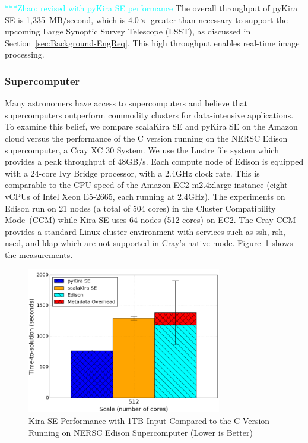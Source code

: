 \documentclass[10pt,journal,compsoc]{IEEEtran}
\newcommand{\zhaonote}[1]{{\textcolor{cyan}    { ***Zhao:      #1 }}}
\newcommand{\zhaonote}[1]{}
\begin{document}
\zhaonote{revised with pyKira SE performance}
The overall throughput of pyKira SE is 1,335~MB/second, which is $4.0\times$ greater than necessary
to support the upcoming Large Synoptic Survey Telescope (LSST), as discussed in
Section~\ref{sec:Background-EngReq}. This high throughput enables real-time image processing.

\subsubsection{Supercomputer}

Many astronomers have access to supercomputers and believe that
supercomputers outperform commodity clusters for data-intensive applications.
To examine this belief, we compare scalaKira SE and pyKira SE on the Amazon cloud versus the performance of
the C version running on the NERSC Edison supercomputer, a Cray XC 30 System. We use
the Lustre file system which provides a peak throughput of 48GB/s. Each compute
node of Edison is equipped with a 24-core Ivy Bridge processor, with a 2.4GHz clock rate.
This is comparable to the CPU speed of the Amazon EC2 m2.4xlarge instance (eight vCPUs of
Intel Xeon E5-2665, each running at 2.4GHz). The experiments on Edison run on 21
nodes (a total of 504 cores) in the Cluster Compatibility Mode~(CCM)
while Kira SE uses 64 nodes (512 cores) on EC2. The Cray CCM provides a 
standard Linux cluster environment with services such as ssh, rsh, nscd, and ldap which 
are not supported in Cray's native mode.
Figure~\ref{fig:1tb-edison} shows the measurements.

\begin{figure}[h]
	\begin{center}
		\includegraphics[width=85mm]{pictures/1TB-edison}
		\caption{Kira SE Performance with 1TB Input Compared to the C Version Running on NERSC Edison Supercomputer (Lower is Better)
		\label{fig:1tb-edison}}
  	\end{center}
\end{figure}
\end{document}
